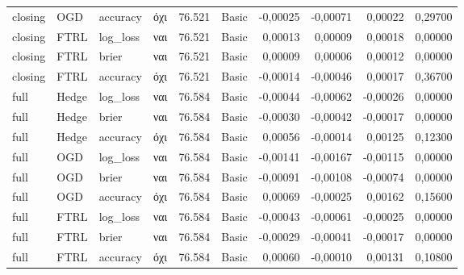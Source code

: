{\begin{longtable}{@{}llllrlrrrr@{}}
closing & OGD & accuracy & όχι & 76.521 & Basic & -0,00025 & -0,00071 & 0,00022 & 0,29700 \\
closing & FTRL & log\_loss & ναι & 76.521 & Basic & 0,00013 & 0,00009 & 0,00018 & 0,00000 \\
closing & FTRL & brier & ναι & 76.521 & Basic & 0,00009 & 0,00006 & 0,00012 & 0,00000 \\
closing & FTRL & accuracy & όχι & 76.521 & Basic & -0,00014 & -0,00046 & 0,00017 & 0,36700 \\
full & Hedge & log\_loss & ναι & 76.584 & Basic & -0,00044 & -0,00062 & -0,00026 & 0,00000 \\
full & Hedge & brier & ναι & 76.584 & Basic & -0,00030 & -0,00042 & -0,00017 & 0,00000 \\
full & Hedge & accuracy & όχι & 76.584 & Basic & 0,00056 & -0,00014 & 0,00125 & 0,12300 \\
full & OGD & log\_loss & ναι & 76.584 & Basic & -0,00141 & -0,00167 & -0,00115 & 0,00000 \\
full & OGD & brier & ναι & 76.584 & Basic & -0,00091 & -0,00108 & -0,00074 & 0,00000 \\
full & OGD & accuracy & όχι & 76.584 & Basic & 0,00069 & -0,00025 & 0,00162 & 0,15600 \\
full & FTRL & log\_loss & ναι & 76.584 & Basic & -0,00043 & -0,00061 & -0,00025 & 0,00000 \\
full & FTRL & brier & ναι & 76.584 & Basic & -0,00029 & -0,00041 & -0,00017 & 0,00000 \\
full & FTRL & accuracy & όχι & 76.584 & Basic & 0,00060 & -0,00010 & 0,00131 & 0,10800 \\
\end{longtable}
}

